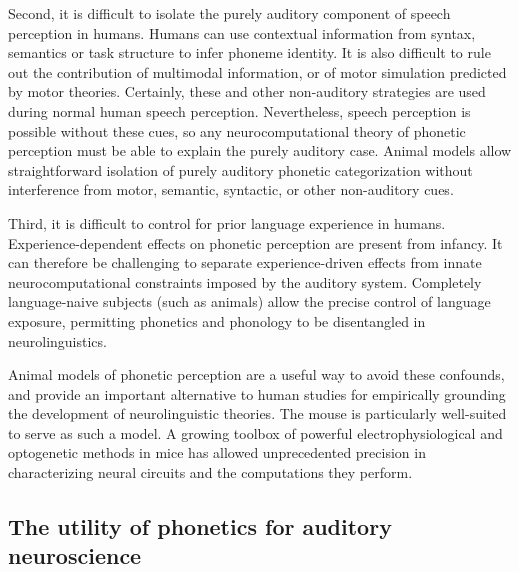 \documentclass[preprint, NumberedRefs]{JASAnew}\usepackage[]{graphicx}\usepackage[]{color}
\begin{document}
Second, it is difficult to isolate the purely auditory component of speech perception in humans. Humans can use contextual information from syntax, semantics or task structure to infer phoneme identity\cite{Fox2016,Schouten2003}. It is also difficult to rule out the contribution of multimodal information\cite{Rosenblum2008}, or of motor simulation predicted by motor theories. Certainly, these and other non-auditory strategies are used during normal human speech perception. Nevertheless, speech perception is possible without these cues, so any neurocomputational theory of phonetic perception must be able to explain the purely auditory case. Animal models allow straightforward isolation of purely auditory phonetic categorization without interference from motor, semantic, syntactic, or other non-auditory cues.

Third, it is difficult to control for prior language experience in humans. Experience-dependent effects on phonetic perception are present from infancy\cite{Kuhl1992}. It can therefore be challenging to separate experience-driven effects from innate neurocomputational constraints imposed by the auditory system. Completely language-naive subjects (such as animals) allow the precise control of language exposure, permitting phonetics and phonology to be disentangled in neurolinguistics.

Animal models of phonetic perception are a useful way to avoid these confounds, and provide an important alternative to human studies for empirically grounding the development of neurolinguistic theories. The mouse is particularly well-suited to serve as such a model. A growing toolbox of powerful electrophysiological and optogenetic methods in mice has allowed unprecedented precision in characterizing neural circuits and the computations they perform.

\subsection{The utility of phonetics for auditory neuroscience}
\end{document}
